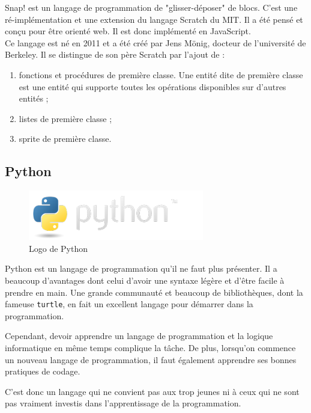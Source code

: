 Snap! \cite{snap} est un langage de programmation de "glisser-déposer" de \glspl{bloc}. C'est une ré-implémentation et une extension du langage Scratch du MIT. Il a été pensé et conçu pour être orienté web. Il est donc implémenté en JavaScript.\\

Ce langage est né en 2011 et a été créé par Jens Mönig, docteur de l'université de Berkeley. Il se distingue de son père Scratch par l'ajout de :
\begin{enumerate}
\item fonctions et procédures de première classe. Une entité dite de première classe est une entité qui supporte toutes les opérations disponibles sur d'autres entités ; %
\item listes de première classe ;
\item \gls{sprite} de première classe.
\end{enumerate}

\subsection{Python}

\begin{figure}[!ht]
  \begin{center}
    \includegraphics[scale=0.4]{content/5-related_work/images/python}
    \caption{Logo de Python}
    \label{fig:python}
  \end{center}
\end{figure}

Python \cite{python} est un langage de programmation qu'il ne faut plus présenter. Il a beaucoup d'avantages dont celui d'avoir une syntaxe légère et d'être facile à prendre en main. Une grande communauté et beaucoup de bibliothèques, dont la fameuse \texttt{turtle}, en fait un excellent langage pour démarrer dans la programmation.

Cependant, devoir apprendre un langage de programmation et la logique informatique en même temps complique la tâche. De plus, lorsqu'on commence un nouveau langage de programmation, il faut également apprendre ses bonnes pratiques de codage. %

C'est donc un langage qui ne convient pas aux trop jeunes ni à ceux qui ne sont pas vraiment investis dans l'apprentissage de la programmation.
